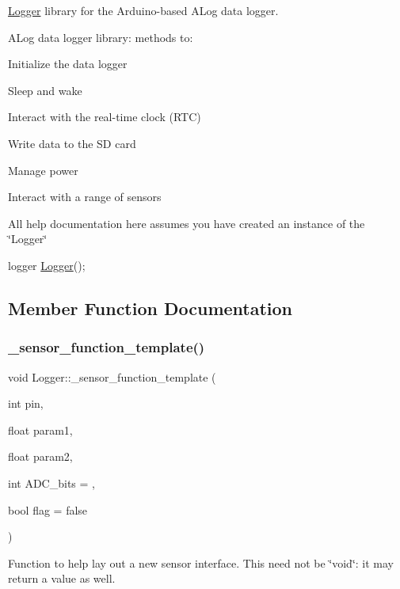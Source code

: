 \hyperlink{classLogger}{Logger} library for the Arduino-\/based A\+Log data logger. 

A\+Log data logger library\+: methods to\+:
\begin{DoxyItemize}
\item Initialize the data logger
\item Sleep and wake
\item Interact with the real-\/time clock (R\+TC)
\item Write data to the SD card
\item Manage power
\item Interact with a range of sensors
\end{DoxyItemize}

All help documentation here assumes you have created an instance of the \char`\"{}\+Logger\char`\"{} 
\begin{DoxyCode}
logger \hyperlink{classLogger_abc41bfb031d896170c7675fa96a6b30c}{Logger}();
\end{DoxyCode}
 

\subsection{Member Function Documentation}
\mbox{\label{classLogger_a98f3cc370c87d1e1eaf3eb6a7e0f1623}} 
\subsubsection{\texorpdfstring{\+\_\+sensor\+\_\+function\+\_\+template()}{\_sensor\_function\_template()}}
{\footnotesize\ttfamily void Logger\+::\+\_\+sensor\+\_\+function\+\_\+template (\begin{DoxyParamCaption}\item[{int}]{pin,  }\item[{float}]{param1,  }\item[{float}]{param2,  }\item[{int}]{A\+D\+C\+\_\+bits = {},  }\item[{bool}]{flag = {\ttfamily false} }\end{DoxyParamCaption})}

Function to help lay out a new sensor interface. This need not be \char`\"{}void\char`\"{}\+: it may return a value as well.

